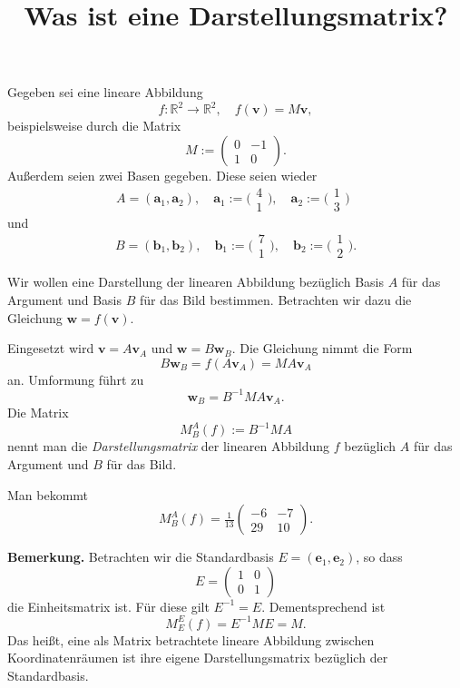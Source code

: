 \documentclass[9pt]{beamer}
\title{Was ist eine Darstellungsmatrix?}
\date{}
\newcommand{\bv}[1]{\mathbf{#1}}
\newcommand{\R}{\mathbb R}
\newcommand{\strong}[1]{\textsf{\textbf{#1}}}
\newcommand{\icol}[1]{
  \big(\!\begin{smallmatrix}#1\end{smallmatrix}\!\big)%
}
\newcommand{\parspace}{\vspace{0.8em}}
\begin{document}
\begin{frame}
\titlepage

\end{frame}

\begin{frame}
Gegeben sei eine lineare Abbildung
\[f\colon\R^2\to\R^2,\quad
f(\bv v) = M\bv v,\]
beispielsweise durch die Matrix
\[M := \begin{pmatrix}0 & -1\\ 1 & 0\end{pmatrix}.\]\pause
Außerdem seien zwei Basen gegeben. Diese seien wieder
\[A = (\bv a_1,\bv a_2),\quad \bv a_1 := \icol{4\\ 1},\quad \bv a_2 := \icol{1\\ 3}\phantom{,}\]
und
\[B = (\bv b_1,\bv b_2),\quad \bv b_1 := \icol{7\\ 1},\quad \bv b_2 := \icol{1\\ 2}.\]
\end{frame}

\begin{frame}
Wir wollen eine Darstellung der linearen Abbildung bezüglich Basis
$A$ für das Argument und Basis $B$ für das Bild bestimmen.
Betrachten wir dazu die Gleichung $\bv w = f(\bv v)$.\pause

\parspace
Eingesetzt wird $\bv v = A\bv v_A$ und $\bv w = B\bv w_B$. Die
Gleichung nimmt die Form
\[B\bv w_B = f(A\bv v_A) = MA\bv v_A\]
an. Umformung führt zu
\[\bv w_B = B^{-1}MA\bv v_A.\]\pause
Die Matrix
\[M_B^A(f) := B^{-1}MA\]
nennt man die \emph{Darstellungsmatrix} der linearen Abbildung $f$
bezüglich $A$ für das Argument und $B$ für das Bild.
\end{frame}

\begin{frame}
Man bekommt
\[M_B^A(f) = \tfrac{1}{13}\begin{pmatrix}
-6 & -7\\
29 & 10
\end{pmatrix}.\]
\end{frame}

\begin{frame}
\strong{Bemerkung.} Betrachten wir die Standardbasis $E=(\bv e_1,\bv e_2)$, so dass
\[E = \begin{pmatrix}1 & 0\\ 0 & 1\end{pmatrix}\]
die Einheitsmatrix ist. Für diese gilt $E^{-1}=E$. Dementsprechend ist
\[M_E^E(f) = E^{-1}ME = M.\]
Das heißt, eine als Matrix betrachtete lineare Abbildung zwischen
Koordinatenräumen ist ihre eigene Darstellungsmatrix bezüglich der
Standardbasis.
\end{frame}
\end{document}
